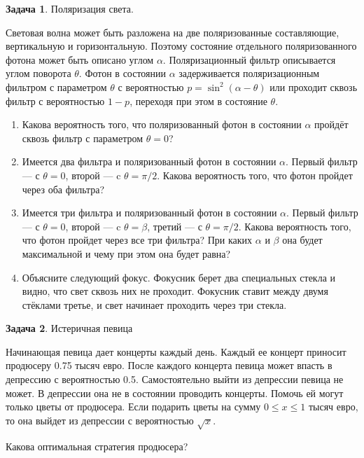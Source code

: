 \documentclass[nobib]{tufte-handout}
\theoremstyle{definition}
\newtheorem{problem}{Задача}
\begin{document}
\begin{problem}
Поляризация света.

Световая волна может быть разложена на две поляризованные составляющие, вертикальную и горизонтальную. Поэтому состояние отдельного поляризованного фотона может быть описано углом $\alpha$. Поляризационный фильтр описывается углом поворота $\theta$. Фотон в состоянии $\alpha$ задерживается поляризационным фильтром с параметром $\theta$ с вероятностью $p=\sin^2(\alpha-\theta)$ или проходит сквозь фильтр с вероятностью $1-p$, переходя при этом в состояние $\theta$.

\begin{enumerate}
\item Какова вероятность того, что поляризованный фотон в состоянии $\alpha$ пройдёт сквозь фильтр с параметром $\theta=0$?
\item Имеется два фильтра и поляризованный фотон в состоянии $\alpha$. Первый фильтр — с $\theta=0$, второй — c $\theta=\pi/2$. Какова вероятность того, что фотон пройдет через оба фильтра?
\item Имеется три фильтра и поляризованный фотон в состоянии $\alpha$. Первый фильтр — с $\theta=0$, второй — c $\theta=\beta$, третий — с $\theta=\pi/2$. Какова вероятность того, что фотон пройдет через все три фильтра? При каких $\alpha$ и $\beta$ она будет максимальной и чему при этом она будет равна?
\item Объясните следующий фокус. Фокусник берет два специальных стекла и видно, что свет сквозь них не проходит. Фокусник ставит между двумя стёклами третье, и свет начинает проходить через три стекла.
\end{enumerate}


\end{problem}


\begin{problem}
Истеричная певица

Начинающая певица дает концерты каждый день. Каждый ее концерт приносит продюсеру 0.75 тысяч евро. После каждого концерта певица может впасть в депрессию с вероятностью 0.5. Самостоятельно выйти из депрессии певица не может. В депрессии она не в состоянии проводить концерты. Помочь ей могут только цветы от продюсера. Если подарить цветы на сумму $0\le x\le 1$ тысяч евро, то она выйдет из депрессии с вероятностью $\sqrt{x}$.

Какова оптимальная стратегия продюсера?

\end{problem}
\end{document}
